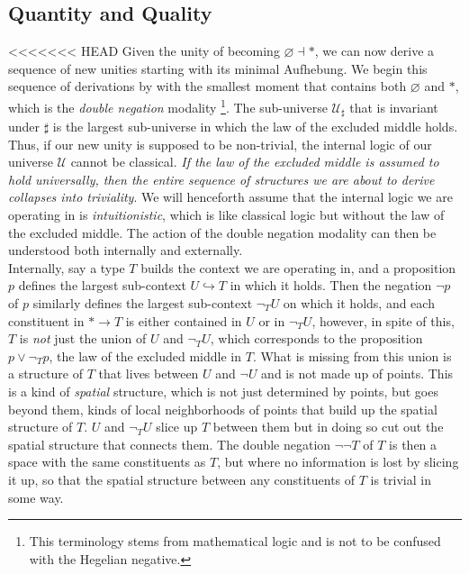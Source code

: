 \documentclass{article}
\begin{document}
\subsection{Quantity and Quality}
<<<<<<< HEAD
Given the unity of becoming $\varnothing\dashv *$, we can now derive a sequence of new unities starting with 
its minimal Aufhebung. We begin this sequence of derivations by with the smallest moment that contains both 
$\varnothing$ and $*$, which is the \emph{double negation} modality\cite{Sketches} \footnote{This terminology
stems from mathematical logic and is not to be confused with the Hegelian negative.}. The sub-universe 
$\mathcal{U}_\sharp$ that is invariant under $\sharp$ is the largest sub-universe in which the law of the 
excluded middle holds. Thus, if our new unity is supposed to be non-trivial, the internal logic of our 
universe $\mathcal{U}$ cannot be classical. \emph{If the law of the excluded middle is assumed to hold 
universally, then the entire sequence of structures we are about to derive collapses into triviality}. We 
will henceforth assume that the internal logic we are operating in is \emph{intuitionistic}, which is like 
classical logic but without the law of the excluded middle. The action of the double negation modality can 
then be understood both internally and externally. \\

Internally, say a type $T$ builds the context we are operating in, and a proposition $p$ defines the largest 
sub-context $U\hookrightarrow T$ in which it holds. Then the negation $\neg p$ of $p$ similarly defines the 
largest sub-context $\neg_T U$ on which it holds, and each constituent in $*\rightarrow T$ is either 
contained in $U$ or in $\neg_T U$, however, in spite of this, $T$ is \emph{not} just the union of $U$ and 
$\neg_T U$, which corresponds to the proposition $p\vee \neg_T p$, the law of the excluded middle in $T$. 
What is missing from this union is a structure of $T$ that lives between $U$ and $\neg U$ and is not made up 
of points. This is a kind of \emph{spatial} structure, which is not just determined by points, but goes 
beyond them, kinds of local neighborhoods of points that build up the spatial structure of $T$. $U$ and 
$\neg_T U$ slice up $T$ between them but in doing so cut out the spatial structure that connects them. The 
double negation $\neg\neg T$ of $T$ is then a space with the same constituents as $T$, but where no 
information is lost by slicing it up, so that the spatial structure between any constituents of $T$ is 
trivial in some way. \\
\end{document}

